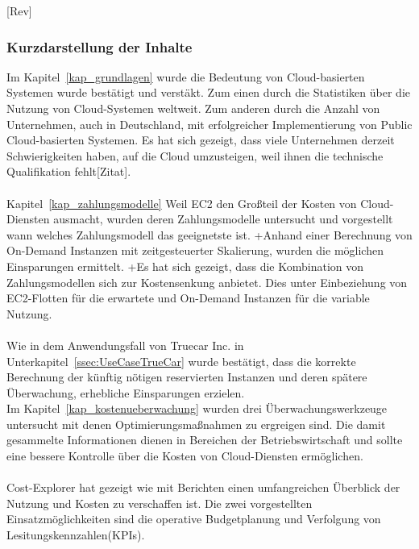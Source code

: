 [Rev]
\subsubsection*{Kurzdarstellung der Inhalte}
Im Kapitel~\ref{kap_grundlagen} %
 wurde die Bedeutung von Cloud-basierten Systemen wurde bestätigt und verstäkt. Zum einen durch die Statistiken\cite{STA1,STA2,STA4} über die Nutzung von Cloud-Systemen weltweit. Zum anderen durch die Anzahl von Unternehmen, auch in Deutschland\cite{ACC2}, mit erfolgreicher Implementierung von Public Cloud-basierten Systemen. Es hat sich gezeigt, dass viele Unternehmen derzeit Schwierigkeiten haben, auf die Cloud umzusteigen, weil ihnen die technische Qualifikation fehlt[Zitat]. 
\\\\
Kapitel~\ref{kap_zahlungsmodelle} Weil EC2 den Großteil der Kosten von Cloud-Diensten ausmacht, wurden deren Zahlungsmodelle untersucht und vorgestellt wann welches Zahlungsmodell das geeignetste ist. 
+Anhand einer Berechnung von On-Demand Instanzen mit zeitgesteuerter Skalierung, wurden die möglichen Einsparungen ermittelt. +Es hat sich gezeigt, dass die Kombination von Zahlungsmodellen sich zur Kostensenkung anbietet. Dies unter Einbeziehung von EC2-Flotten für die erwartete und On-Demand Instanzen für die variable Nutzung.%
%
\\\\
Wie in dem Anwendungsfall von Truecar Inc. in Unterkapitel~\ref{ssec:UseCaseTrueCar} %
wurde bestätigt, dass die korrekte Berechnung der künftig nötigen reservierten Instanzen und deren spätere Überwachung, erhebliche Einsparungen erzielen.
\\
Im Kapitel~\ref{kap_kostenueberwachung} wurden drei Überwachungswerkzeuge untersucht mit denen Optimierungsmaßnahmen zu ergreigen sind. Die damit gesammelte Informationen dienen in Bereichen der Betriebswirtschaft und sollte eine bessere Kontrolle über die Kosten von Cloud-Diensten ermöglichen.
\\\\
Cost-Explorer hat gezeigt wie mit Berichten einen umfangreichen Überblick der Nutzung und Kosten zu verschaffen ist. Die zwei vorgestellten Einsatzmöglichkeiten sind die operative Budgetplanung und Verfolgung von Lesitungskennzahlen(KPIs).
